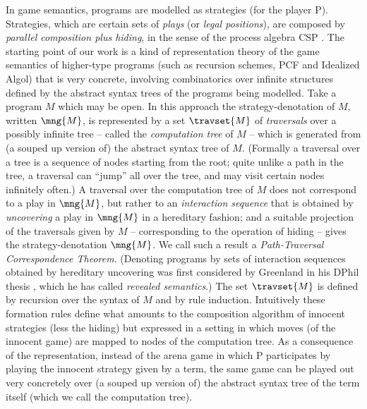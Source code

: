 In game semantics, programs are modelled as strategies (for the player P). Strategies, which are certain sets of \emph{plays} (or \emph{legal positions}), are composed by \emph{parallel composition plus hiding}, in the sense of the process algebra CSP \cite{Hoa85}. The starting point of our work is a kind of representation theory of the game semantics of higher-type programs (such as recursion schemes, PCF and Idealized Algol) that is very concrete, involving combinatorics over infinite structures defined by the abstract syntax trees of the programs being modelled. Take a program $M$ which may be open. In this approach the strategy-denotation of $M$, written $\mng{M}$, is represented by a set $\travset{M}$ of \emph{traversals} over a possibly infinite tree -- called the \emph{computation tree} of $M$ -- which is generated from (a souped up version of) the abstract syntax tree of $M$. (Formally a traversal over a tree is a sequence of nodes starting from the root; quite unlike a path in the tree, a traversal can ``jump'' all over the tree, and may visit certain nodes infinitely often.) A traversal over the computation tree of $M$ does not correspond to a play in $\mng{M}$, but rather to an \emph{interaction sequence} that is obtained by \emph{uncovering} \cite{HO00} a play in $\mng{M}$ in a hereditary fashion; and a suitable projection of the traversals given by $M$ -- corresponding to the operation of hiding -- gives the strategy-denotation $\mng{M}$. We call such a result a \emph{Path-Traversal Correspondence Theorem}. (Denoting programs by sets of interaction sequences obtained by hereditary uncovering was first considered by Greenland in his DPhil thesis \cite{Gre05}, which he has called \emph{revealed semantics}.) The set $\travset{M}$ is defined by recursion over the syntax of $M$ and by rule induction.
Intuitively these formation rules define what amounts to the composition algorithm of innocent strategies (less the hiding) but expressed in a setting in which moves (of the innocent game) are mapped to nodes of the computation tree. As a consequence of the representation, instead of the arena game in which P participates by playing the innocent strategy given by a term, the same game can be played out very concretely over (a souped up version of) the abstract syntax tree of the term itself (which we call the computation tree).

